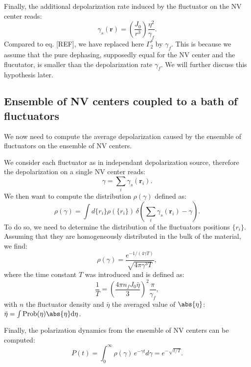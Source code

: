 \documentclass[a4paper,11pt]{report}
\begin{document}
Finally, the additional depolarization rate induced by the fluctuator on the NV center reads:
\begin{equation}
\gamma_s(\mathbf{r})=\left(\frac{J_0}{r^3}\right) \frac{\eta^2}{\gamma_f}.
\end{equation}
Compared to eq. [REF], we have replaced here $\Gamma_2^*$ by $\gamma_f$. This is because we assume that the pure dephasing, supposedly equal for the NV center and the flucutator, is smaller than the depolarization rate $\gamma_f$. We will further discuss this hypothesis later.

\subsection{Ensemble of NV centers coupled to a bath of fluctuators}

We now need to compute the average depolarization caused by the ensemble of fluctuators on the ensemble of NV centers.

We consider each fluctuator as in independant depolarization source, therefore the depolarization on a single NV center reads: 
\begin{equation}
\gamma=\sum_i \gamma_s(\mathbf{r}_i).
\end{equation}
We then want to compute the distribution $\rho(\gamma)$ defined as:
\begin{equation}
\rho(\gamma)=\int d\{r_i\} \rho(\{r_i\})\, \delta \left( \sum_i \gamma_s(\mathbf{r}_i) - \gamma \right).
\end{equation}
To do so, we need to determine the distribution of the fluctuators positions $\{r_i\}$. Assuming that they are homogeneously distributed in the bulk of the material, we find:
\begin{equation}
\rho(\gamma)=\frac{e^{-1/(4\gamma T)}}{\sqrt{4\pi \gamma^3 T}},
\end{equation}
where the time constant $T$ was introduced and is defined as:
\begin{equation}
\frac{1}{T}=\left(\frac{4\pi n_fJ_0\bar \eta}{3}\right)^2 \frac{\pi}{\gamma_f},
\label{eq 1/T}
\end{equation}
with $n$ the fluctuator density and $\bar \eta$ the averaged value of $\abs{\eta}$: $\bar \eta = \int \rm{Prob}(\eta) \abs{\eta} d\eta$.

Finally, the polarization dynamics from the ensemble of NV centers can be computed:
\begin{equation}
P(t)=\int_0^\infty \rho(\gamma)\, e^{-\gamma t}d\gamma= e^{-\sqrt{t/T}}.
\end{equation}
\end{document}

